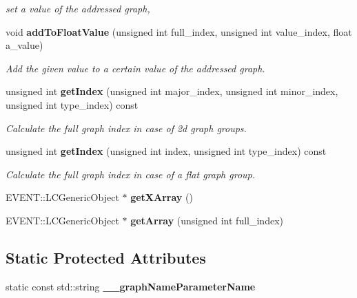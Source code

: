 \begin{DoxyCompactItemize}
\begin{DoxyCompactList}\small\item\em set a value of the addressed graph, \end{DoxyCompactList}\item 
void {\bf add\-To\-Float\-Value} (unsigned int full\-\_\-index, unsigned int value\-\_\-index, float a\-\_\-value)\label{classhistmgr_1_1GraphCollection__t_a5e747206119488483b0b46c11342dace}

\begin{DoxyCompactList}\small\item\em Add the given value to a certain value of the addressed graph. \end{DoxyCompactList}\item 
unsigned int {\bf get\-Index} (unsigned int major\-\_\-index, unsigned int minor\-\_\-index, unsigned int type\-\_\-index) const \label{classhistmgr_1_1GraphCollection__t_ae56f52a4ec2a8188b7a3be59c2f90090}

\begin{DoxyCompactList}\small\item\em Calculate the full graph index in case of 2d graph groups. \end{DoxyCompactList}\item 
unsigned int {\bf get\-Index} (unsigned int index, unsigned int type\-\_\-index) const \label{classhistmgr_1_1GraphCollection__t_a6babd769d8db88965939660a221ea4b9}

\begin{DoxyCompactList}\small\item\em Calculate the full graph index in case of a flat graph group. \end{DoxyCompactList}\item 
E\-V\-E\-N\-T\-::\-L\-C\-Generic\-Object $\ast$ {\bfseries get\-X\-Array} ()\label{classhistmgr_1_1GraphCollection__t_a2dbf7fc55d252547d24cbac999f0f55e}

\item 
E\-V\-E\-N\-T\-::\-L\-C\-Generic\-Object $\ast$ {\bfseries get\-Array} (unsigned int full\-\_\-index)\label{classhistmgr_1_1GraphCollection__t_a3e2a4928f2ff0d2249771d76be53c82e}

\end{DoxyCompactItemize}
\subsection*{Static Protected Attributes}
\begin{DoxyCompactItemize}
\item 
static const std\-::string {\bfseries \-\_\-\-\_\-graph\-Name\-Parameter\-Name}\label{classhistmgr_1_1GraphCollection__t_a1c88428395aa2448fa920b2fd3fc21c1}

\end{DoxyCompactItemize}
